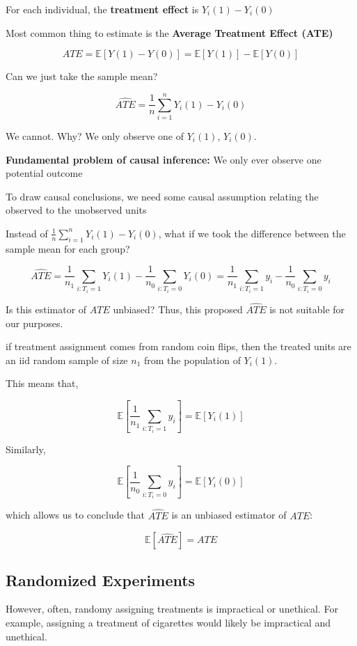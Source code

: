 \documentclass[
  letterpaper,
  DIV=11,
  numbers=noendperiod]{scrreprt}
\begin{document}
For each individual, the \textbf{treatment effect} is
\(Y_{i}(1)-Y_{i}(0)\)

Most common thing to estimate is the \textbf{Average Treatment Effect
(ATE)}

\[ATE = \mathbb{E}[Y(1)-Y(0)] = \mathbb{E}[Y(1)] - \mathbb{E}[Y(0)]\]

Can we just take the sample mean?

\[\hat{ATE} = \frac{1}{n}\sum_{i=1}^{n}Y_{i}(1) - Y_{i}(0)\]

We cannot. Why? We only observe one of \(Y_{i}(1)\), \(Y_{i}(0)\).

\textbf{Fundamental problem of causal inference:} We only ever observe
one potential outcome

To draw causal conclusions, we need some causal assumption relating the
observed to the unobserved units

Instead of \(\frac{1}{n}\sum_{i=1}^{n}Y_{i}(1) - Y_{i}(0)\), what if we
took the difference between the sample mean for each group?

\[\hat{ATE} = \frac{1}{n_{1}}\sum_{i: T_{i} = 1}{Y_{i}(1)} - \frac{1}{n_{0}}\sum_{i: T_{i} = 0}{Y_{i}(0)} = \frac{1}{n_{1}}\sum_{i: T_{i} = 1}{y_{i}} - \frac{1}{n_{0}}\sum_{i: T_{i} = 0}{y_{i}}\]

Is this estimator of \(ATE\) unbiased? Thus, this proposed \(\hat{ATE}\)
is not suitable for our purposes.

if treatment assignment comes from random coin flips, then the treated
units are an iid random sample of size \(n_{1}\) from the population of
\(Y_{i}(1)\).

This means that,

\[\mathbb{E}[\frac{1}{n_{1}}\sum_{i: T_{i} = 1}{y_{i}}] = \mathbb{E}[Y_{i}(1)]\]

Similarly,

\[\mathbb{E}[\frac{1}{n_{0}}\sum_{i: T_{i} = 0}{y_{i}}] = \mathbb{E}[Y_{i}(0)]\]

which allows us to conclude that \(\hat{ATE}\) is an unbiased estimator
of \(ATE\):

\[\mathbb{E}[\hat{ATE}] = ATE\]

\hypertarget{randomized-experiments}{%
\subsection{Randomized Experiments}\label{randomized-experiments}}

However, often, randomy assigning treatments is impractical or
unethical. For example, assigning a treatment of cigarettes would likely
be impractical and unethical.
\end{document}
